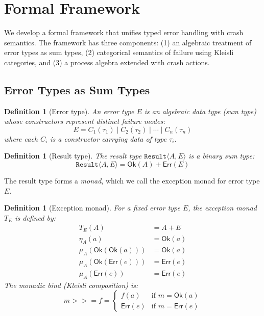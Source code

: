 \documentclass[11pt,twocolumn]{article}
\newtheorem{definition}[theorem]{Definition}
\newcommand{\Result}{\texttt{Result}}
\newcommand{\OK}{\ensuremath{\mathsf{Ok}}}
\newcommand{\Err}{\ensuremath{\mathsf{Err}}}
\begin{document}
\section{Formal Framework}\label{sec:formal}

We develop a formal framework that unifies typed error handling with crash semantics. The framework has three components: (1) an algebraic treatment of error types as sum types, (2) categorical semantics of failure using Kleisli categories, and (3) a process algebra extended with crash actions.

\subsection{Error Types as Sum Types}

\begin{definition}[Error type]
An \emph{error type} $E$ is an algebraic data type (sum type) whose constructors represent distinct failure modes:
\[
  E = C_1(\tau_1) \mid C_2(\tau_2) \mid \cdots \mid C_n(\tau_n)
\]
where each $C_i$ is a constructor carrying data of type $\tau_i$.
\end{definition}

\begin{definition}[Result type]
The \emph{result type} $\Result\langle A, E\rangle$ is a binary sum type:
\[
  \Result\langle A, E\rangle = \OK(A) + \Err(E)
\]
\end{definition}

The result type forms a \emph{monad}, which we call the exception monad for error type $E$.

\begin{definition}[Exception monad]
For a fixed error type $E$, the exception monad $T_E$ is defined by:
\begin{align*}
  T_E(A) &= A + E \\
  \eta_A(a) &= \OK(a) \\
  \mu_A(\OK(\OK(a))) &= \OK(a) \\
  \mu_A(\OK(\Err(e))) &= \Err(e) \\
  \mu_A(\Err(e)) &= \Err(e)
\end{align*}
The monadic bind (Kleisli composition) is:
\[
  m \mathbin{>\!\!>\!\!=} f = \begin{cases}
    f(a) & \text{if } m = \OK(a) \\
    \Err(e) & \text{if } m = \Err(e)
  \end{cases}
\]
\end{definition}
\end{document}
